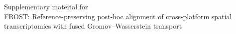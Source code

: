 \documentclass[11pt]{article}
\begin{document}
\begin{center}
{\Large Supplementary material for}\\[4pt]
{\large FROST: Reference-preserving post-hoc alignment of cross-platform spatial transcriptomics with fused Gromov--Wasserstein transport}
\end{center}





\end{document}
